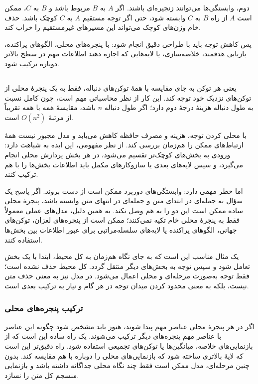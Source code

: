 دوم، وابستگی‌ها می‌توانند زنجیره‌ای باشند. اگر \(A\) به \(B\) مربوط باشد و \(B\) به \(C\)، ممکن است \(A\) از راه \(B\) به \(C\) وابسته شود، حتی اگر توجه مستقیم \(A\) به \(C\) کوچک باشد. حذف خام وزن‌های کوچک می‌تواند این مسیرهای غیرمستقیم را خراب کند.

پس کاهش توجه باید با طراحی دقیق انجام شود: با پنجره‌های محلی، الگوهای پراکنده، بازیابی هدفمند، خلاصه‌سازی، یا لایه‌هایی که اجازه دهند اطلاعات مهم در سطح بالاتر دوباره ترکیب شود.

\subsection{}
 یعنی هر توکن به جای مقایسه با همهٔ توکن‌های دنباله، فقط به یک پنجرهٔ محلی از توکن‌های نزدیک خود توجه کند. این کار از نظر محاسباتی مهم است، چون  کامل نسبت به طول دنباله هزینهٔ درجهٔ دوم دارد؛ اگر طول دنباله \(n\) باشد، مقایسهٔ همه با همه تقریباً از مرتبهٔ \(O(n^2)\) است.

با محلی کردن توجه، هزینه و مصرف حافظه کاهش می‌یابد و مدل مجبور نیست همهٔ ارتباط‌های ممکن را هم‌زمان بررسی کند. از نظر مفهومی، این ایده به  شباهت دارد: ورودی به بخش‌های کوچک‌تر تقسیم می‌شود، در هر بخش پردازش محلی انجام می‌گیرد، و سپس لایه‌های بعدی یا سازوکارهای مکمل باید اطلاعات بخش‌ها را با هم ترکیب کنند.

اما  خطر مهمی دارد: وابستگی‌های دوربرد ممکن است از دست بروند. اگر پاسخ یک سؤال به جمله‌ای در ابتدای متن و جمله‌ای در انتهای متن وابسته باشد، پنجرهٔ محلی ساده ممکن است این دو را به هم وصل نکند. به همین دلیل، مدل‌های عملی معمولاً فقط به پنجرهٔ محلی خام تکیه نمی‌کنند؛ ممکن است از پنجره‌های لغزان، توکن‌های جهانی، الگوهای پراکنده یا لایه‌های سلسله‌مراتبی برای عبور اطلاعات بین بخش‌ها استفاده کنند.

یک مثال مناسب این است که به جای نگاه هم‌زمان به کل محیط، ابتدا با یک بخش تعامل شود و سپس توجه به بخش‌های دیگر منتقل گردد. کل محیط حذف نشده است؛ فقط توجه به‌صورت مرحله‌ای و محلی اعمال می‌شود. در مدل نیز  به معنی حذف متن نیست، بلکه به معنی محدود کردن میدان توجه در هر گام و نیاز به ترکیب بعدی است.

\subsubsection{ترکیب پنجره‌های محلی}
اگر در هر پنجرهٔ محلی عناصر مهم پیدا شوند، هنوز باید مشخص شود چگونه این عناصر با عناصر مهم پنجره‌های دیگر ترکیب می‌شوند. یک راه ساده این است که از بازنمایی‌های خلاصه، میانگین‌ها یا توکن‌های تجمیعی استفاده شود. راه دقیق‌تر این است که لایهٔ بالاتری ساخته شود که بازنمایی‌های محلی را دوباره با هم مقایسه کند. بدون چنین مرحله‌ای، مدل ممکن است فقط چند نگاه محلی جداگانه داشته باشد و بازنمایی منسجم کل متن را نسازد.

